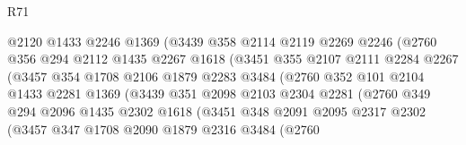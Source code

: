 \begin{lexlean}{R71}
\begin{coremodule}
                          @2120
                          @1433
                          @2246
                          @1369
                          (@3439
                            @358
                            @2114
                            @2119
                            @2269
                            @2246
                            (@2760
                              @356
                              @294
                              @2112
                              @1435
                              @2267
                              @1618
                              (@3451
                                @355
                                @2107
                                @2111
                                @2284
                                @2267
                                (@3457
                                  @354
                                  @1708
                                  @2106
                                  @1879
                                  @2283
                                  @3484
                                  (@2760
                                    @352
                                    @101
                                    @2104
                                    @1433
                                    @2281
                                    @1369
                                    (@3439
                                      @351
                                      @2098
                                      @2103
                                      @2304
                                      @2281
                                      (@2760
                                        @349
                                        @294
                                        @2096
                                        @1435
                                        @2302
                                        @1618
                                        (@3451
                                          @348
                                          @2091
                                          @2095
                                          @2317
                                          @2302
                                          (@3457
                                            @347
                                            @1708
                                            @2090
                                            @1879
                                            @2316
                                            @3484
                                            (@2760

\end{coremodule}
\end{lexlean}
